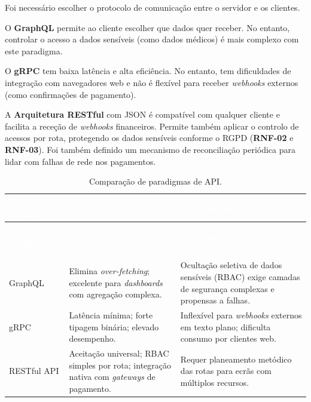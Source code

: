 Foi necessário escolher o protocolo de comunicação entre o servidor e os clientes.

O \textbf{GraphQL} permite ao cliente escolher que dados quer receber. No entanto, controlar o acesso a dados sensíveis (como dados médicos) é mais complexo com este paradigma.

O \textbf{gRPC} tem baixa latência e alta eficiência. No entanto, tem dificuldades de integração com navegadores web e não é flexível para receber \textit{webhooks} externos (como confirmações de pagamento).

A \textbf{Arquitetura RESTful} com JSON é compatível com qualquer cliente e facilita a receção de \textit{webhooks} financeiros. Permite também aplicar o controlo de acessos por rota, protegendo os dados sensíveis conforme o RGPD (\textbf{RNF-02} e \textbf{RNF-03}). Foi também definido um mecanismo de reconciliação periódica para lidar com falhas de rede nos pagamentos.

\begin{center}
{\small
{}
\begin{xltabular}{\textwidth}{|>{\raggedright\arraybackslash}p{3.5cm}|>{\raggedright\arraybackslash}X|>{\raggedright\arraybackslash}X|}
\hline
{}\textcolor{white}{\textbf{Paradigma de API}} & \textcolor{white}{\textbf{Vantagens}} & \textcolor{white}{\textbf{Desvantagens}} \\ \hline
\endfirsthead

 \\
\hline
{}\textcolor{white}{\textbf{Paradigma de API}} & \textcolor{white}{\textbf{Vantagens}} & \textcolor{white}{\textbf{Desvantagens}} \\ \hline
\endhead

\hline {} \\ \hline \endfoot

\hline
\caption{Comparação de paradigmas de API.}
\label{tab:comparacao_api} \\
\endlastfoot

GraphQL & Elimina \textit{over-fetching}; excelente para \textit{dashboards} com agregação complexa. & Ocultação seletiva de dados sensíveis (RBAC) exige camadas de segurança complexas e propensas a falhas. \\ \hline
gRPC & Latência mínima; forte tipagem binária; elevado desempenho. & Inflexível para \textit{webhooks} externos em texto plano; dificulta consumo por clientes web. \\ \hline
RESTful API & Aceitação universal; RBAC simples por rota; integração nativa com \textit{gateways} de pagamento. & Requer planeamento metódico das rotas para ecrãs com múltiplos recursos. \\ \hline
\end{xltabular}
}
\end{center}

